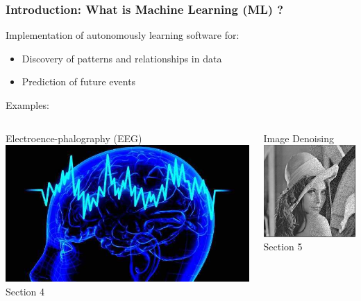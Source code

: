 \documentclass[10pt]{beamer}
\begin{document}
  \begin{frame}[t]\frametitle{Introduction: What is Machine Learning (ML) ?}
	  	Implementation of autonomously learning software for:
        \begin{itemize}
        	\item Discovery of patterns and relationships in data
        	\item Prediction of future events
        \end{itemize}
        \vspace{5pt}
        \alert{Examples:}
        \begin{columns}
        	\begin{column}{.5\linewidth}
        		Electroence-phalography (EEG)\\
        		\includegraphics[width = 0.8\linewidth]{eeg_pic.jpg}\\
        		\alert{Section 4}
        	\end{column}\hspace{-10pt}
        	\begin{column}{.5\linewidth}
        		Image Denoising\\
        		\includegraphics[width = 0.8\linewidth]{lena_pic.jpg}\\
        		\alert{Section 5}
        	\end{column}
        \end{columns}
  \end{frame}
\end{document}
